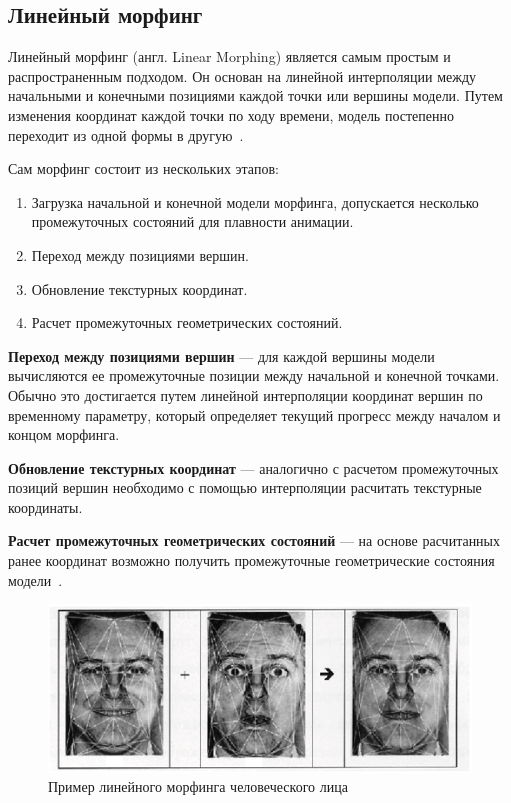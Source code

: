 \subsection{Линейный морфинг}
Линейный морфинг (англ. Linear Morphing) является самым простым и распространенным подходом. 
Он основан на линейной интерполяции между начальными и конечными позициями каждой точки или вершины модели.
Путем изменения координат каждой точки по ходу времени, модель постепенно переходит из одной формы в другую~\cite{DMorph}.

Сам морфинг состоит из нескольких этапов: 
\begin{enumerate}
	\item Загрузка начальной и конечной модели морфинга, допускается несколько промежуточных состояний для плавности анимации.
	\item Переход между позициями вершин.
	\item Обновление текстурных координат.
	\item Расчет промежуточных геометрических состояний.
\end{enumerate}
\textbf{Переход между позициями вершин} --- для каждой вершины модели вычисляются ее промежуточные позиции между начальной и конечной точками.
Обычно это достигается путем линейной интерполяции координат вершин по временному параметру, который определяет текущий прогресс между началом и концом морфинга.

\textbf{Обновление текстурных координат} --- аналогично с расчетом промежуточных позиций вершин необходимо с помощью интерполяции расчитать текстурные координаты.

\textbf{Расчет промежуточных геометрических состояний} --- на основе расчитанных ранее координат возможно получить промежуточные геометрические состояния модели~\cite{DMorph}.

\begin{figure}[h]
	\centering
	\includegraphics{images/morhing_faces.png}
	\caption{Пример линейного морфинга человеческого лица}
	\label{fig:morhing_faces}
\end{figure}

